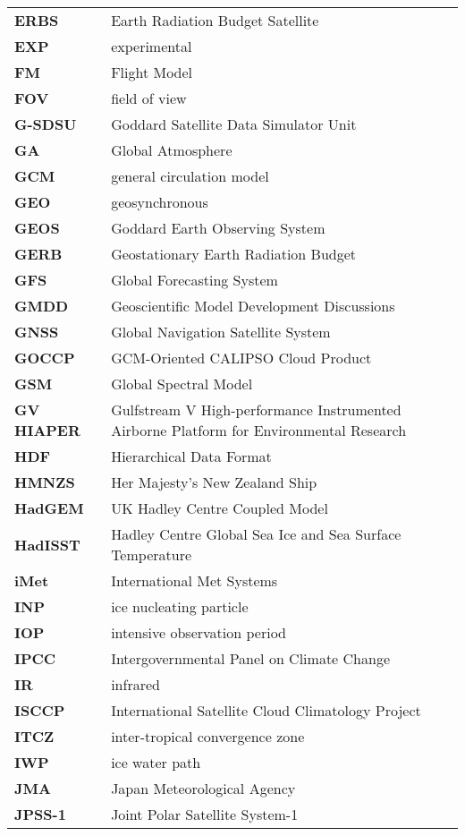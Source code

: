 \begin{longtable}{@{}p{2cm}p{20cm}}
\textbf{ERBS} & Earth Radiation Budget Satellite\\
\textbf{EXP} & experimental\\
\textbf{FM} & Flight Model\\
\textbf{FOV} & field of view\\
\textbf{G-SDSU} & Goddard Satellite Data Simulator Unit\\
\textbf{GA} & Global Atmosphere\\
\textbf{GCM} & general circulation model\\
\textbf{GEO} & geosynchronous\\
\textbf{GEOS} & Goddard Earth Observing System\\
\textbf{GERB} & Geostationary Earth Radiation Budget\\
\textbf{GFS} & Global Forecasting System\\
\textbf{GMDD} & Geoscientific Model Development Discussions\\
\textbf{GNSS} & Global Navigation Satellite System\\
\textbf{GOCCP} & GCM-Oriented CALIPSO Cloud Product\\
\textbf{GSM} & Global Spectral Model\\
\textbf{GV HIAPER} & Gulfstream V High-performance Instrumented Airborne
Platform for Environmental Research\\
\textbf{HDF} & Hierarchical Data Format\\
\textbf{HMNZS} & Her Majesty's New Zealand Ship\\
\textbf{HadGEM} & UK Hadley Centre Coupled Model\\
\textbf{HadISST} & Hadley Centre Global Sea Ice and Sea Surface Temperature\\
\textbf{iMet} & International Met Systems\\
\textbf{INP} & ice nucleating particle\\
\textbf{IOP} & intensive observation period\\
\textbf{IPCC} & Intergovernmental Panel on Climate Change\\
\textbf{IR} & infrared\\
\textbf{ISCCP} & International Satellite Cloud Climatology Project\\
\textbf{ITCZ} & inter-tropical convergence zone\\
\textbf{IWP} & ice water path\\
\textbf{JMA} & Japan Meteorological Agency\\
\textbf{JPSS-1} & Joint Polar Satellite System-1\\

\end{longtable}
